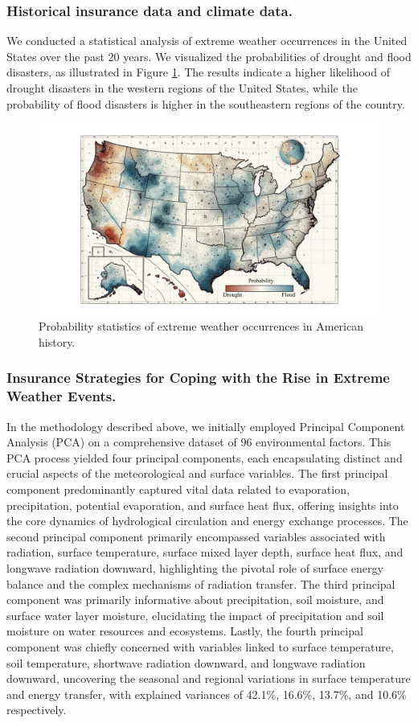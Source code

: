 \documentclass[12pt]{article}
\begin{document}
\subsubsection{Historical insurance data and climate data.}
We conducted a statistical analysis of extreme weather occurrences in the United States over the past 20 years. We visualized the probabilities of drought and flood disasters, as illustrated in Figure \ref{fig:etrea}. The results indicate a higher likelihood of drought disasters in the western regions of the United States, while the probability of flood disasters is higher in the southeastern regions of the country.
\begin{figure}[h]
    \centering
    \includegraphics[width=0.8\linewidth]{figure/weather_a.pdf}
    \caption{Probability statistics of extreme weather occurrences in American history.}
    \label{fig:etrea}
\end{figure}

\subsubsection{Insurance Strategies for Coping with the Rise in Extreme Weather Events.}
In the methodology described above, we initially employed Principal Component Analysis (PCA) on a comprehensive dataset of 96 environmental factors. This PCA process yielded four principal components, each encapsulating distinct and crucial aspects of the meteorological and surface variables. The first principal component predominantly captured vital data related to evaporation, precipitation, potential evaporation, and surface heat flux, offering insights into the core dynamics of hydrological circulation and energy exchange processes. The second principal component primarily encompassed variables associated with radiation, surface temperature, surface mixed layer depth, surface heat flux, and longwave radiation downward, highlighting the pivotal role of surface energy balance and the complex mechanisms of radiation transfer. The third principal component was primarily informative about precipitation, soil moisture, and surface water layer moisture, elucidating the impact of precipitation and soil moisture on water resources and ecosystems. Lastly, the fourth principal component was chiefly concerned with variables linked to surface temperature, soil temperature, shortwave radiation downward, and longwave radiation downward, uncovering the seasonal and regional variations in surface temperature and energy transfer, with explained variances of 42.1\%, 16.6\%, 13.7\%, and 10.6\% respectively.
\end{document}
